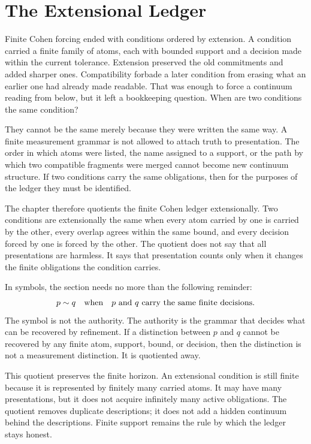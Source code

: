 \section{The Extensional Ledger}

Finite Cohen forcing ended with conditions ordered by extension. A condition
carried a finite family of atoms, each with bounded support and a decision
made within the current tolerance. Extension preserved the old commitments and
added sharper ones. Compatibility forbade a later condition from erasing what
an earlier one had already made readable. That was enough to force a continuum
reading from below, but it left a bookkeeping question. When are two
conditions the same condition?

They cannot be the same merely because they were written the same way. A
finite measurement grammar is not allowed to attach truth to presentation.
The order in which atoms were listed, the name assigned to a support, or the
path by which two compatible fragments were merged cannot become new
continuum structure. If two conditions carry the same obligations, then for
the purposes of the ledger they must be identified.

The chapter therefore quotients the finite Cohen ledger extensionally. Two
conditions are extensionally the same when every atom carried by one is
carried by the other, every overlap agrees within the same bound, and every
decision forced by one is forced by the other. The quotient does not say that
all presentations are harmless. It says that presentation counts only when it
changes the finite obligations the condition carries.

In symbols, the section needs no more than the following reminder:
\[
  p \sim q
  \quad\hbox{when}\quad
  p\hbox{ and }q\hbox{ carry the same finite decisions.}
\]
The symbol is not the authority. The authority is the grammar that decides
what can be recovered by refinement. If a distinction between \(p\) and \(q\)
cannot be recovered by any finite atom, support, bound, or decision, then the
distinction is not a measurement distinction. It is quotiented away.

This quotient preserves the finite horizon. An extensional condition is still
finite because it is represented by finitely many carried atoms. It may have
many presentations, but it does not acquire infinitely many active
obligations. The quotient removes duplicate descriptions; it does not add a
hidden continuum behind the descriptions. Finite support remains the rule by
which the ledger stays honest.

